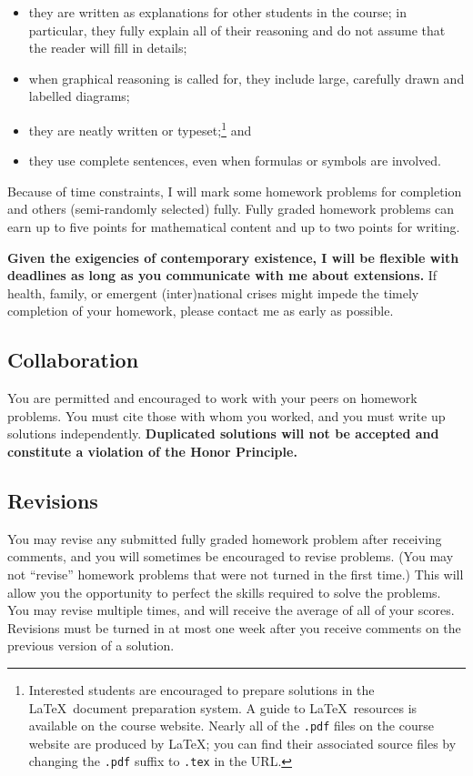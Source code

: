 \documentclass[11pt,twoside]{amsart}
\begin{document}
\begin{itemize}
\item they are written as explanations for other students in the course; in particular, they fully explain all of their reasoning and do not assume that the reader will fill in details;
\item when graphical reasoning is called for, they include large, carefully drawn and labelled diagrams;
\item they are neatly written or typeset;\footnote{Interested students are 
encouraged to prepare solutions in the \LaTeX~document preparation 
system.  A guide to \LaTeX~resources is available on the course 
website.  Nearly all of the \texttt{.pdf} files on the course website are produced by \LaTeX; you can find their associated source files by changing the \texttt{.pdf} suffix to \texttt{.tex} in the URL.} and
\item they use complete sentences, even when formulas or symbols are involved.
\end{itemize}

Because of time constraints, I will mark some homework problems for completion and others (semi-randomly selected) fully.  Fully graded homework problems can earn up to five points for mathematical content and up to two points for writing.

\textbf{Given the exigencies of contemporary existence, I will be flexible with deadlines as long as you communicate with me about extensions.} If health, family, or emergent (inter)national crises might impede the timely completion of your homework, please contact me as early as possible.

\subsection*{Collaboration}
You are permitted and encouraged to work with your peers on homework problems.  You must cite those with whom you worked, and you must write up solutions independently.  \textbf{Duplicated solutions will not be accepted and constitute a violation of the Honor Principle.}

\subsection*{Revisions}
You may revise any submitted fully graded homework problem after receiving comments, and you will sometimes be encouraged to revise problems.  (You may not ``revise'' homework problems that were not turned in the first time.)  This will allow you the opportunity to perfect the skills required to solve the problems.  You may revise multiple times, and will receive the average of all of your scores.  Revisions must be turned in at most one week after you receive comments on the previous version of a solution.
\end{document}
